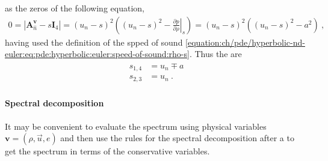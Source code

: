 \documentclass[letterpaper,10pt,english]{jupyterBook}
\begin{document}
\sphinxAtStartPar
as the zeros of the following equation,
\begin{equation*}
\begin{split}0 = | \mathbf{A}_{\hat{n}}^{\mathbf{v}} - s \mathbf{I}_4| = ( u_n - s )^2 \left( ( u_n - s )^2 - \left.\frac{\partial p}{\partial \rho}\right|_s \right) = ( u_n - s )^2 \left( ( u_n - s )^2 - a^2 \right) \ ,\end{split}
\end{equation*}
\sphinxAtStartPar
having used the definition of the spped of sound \eqref{equation:ch/pde/hyperbolic-nd-euler:eq:pde:hyperbolic:euler:speed-of-sound:rho-s}. Thus the  are
\begin{equation}\label{equation:ch/pde/hyperbolic-nd-euler:eq:pde:hyperbolic:differential:convective:euler:rho-u-s:eigval}
\begin{split}\begin{aligned}
  s_{1,4} & = u_n \mp a \\
  s_{2,3} & = u_n \ .
\end{aligned}\end{split}
\end{equation}

\paragraph{Spectral decomposition}
\label{\detokenize{ch/pde/hyperbolic-nd-euler:spectral-decomposition}}\label{\detokenize{ch/pde/hyperbolic-nd-euler:pde-hyperbolic-nd-euler-differential-spectrum}}
\sphinxAtStartPar
It may be convenient to evaluate the spectrum using physical variables \(\mathbf{v} = (\rho, \vec{u}, e)\) and then use the rules for the spectral decomposition after a {\hyperref[\detokenize{ch/pde/hyperbolic-nd-draft:pde-hyperbolic-nd-draft-characteristics-spectrum-change-vars}]{}} to get the spectrum in terms of the conservative variables.
\end{document}
